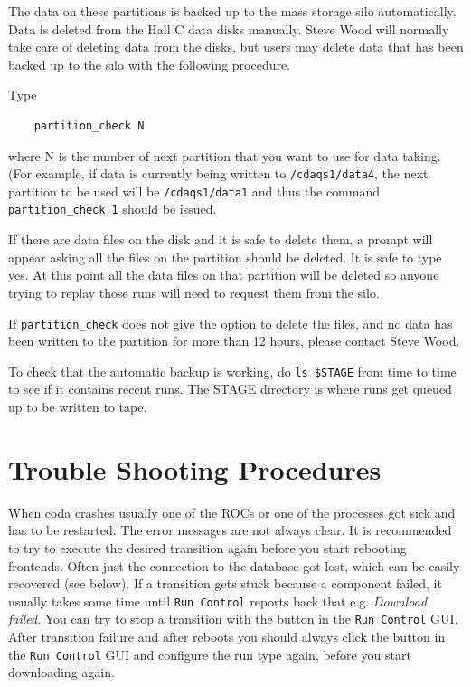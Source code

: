 The data on these partitions is backed up to the mass storage silo
automatically.  Data is deleted from the Hall C data disks manually.
Steve Wood will normally take care of deleting data from the disks, but users
may delete data that has been backed up to the silo with the following
procedure.

Type

\begin{verbatim}
	partition_check N
\end{verbatim}

where N is the number of next partition that you want to use for data taking.
(For example, if data is currently being written to \verb|/cdaqs1/data4|, the 
next
partition to be used will be \verb|/cdaqs1/data1| and thus the command
\verb|partition_check 1| should be issued.

If there are data files on the disk and it is safe to delete them, a prompt 
will appear asking all the files on the partition should be deleted.  
It is safe to
type yes.  At this point all the data files on that partition will be deleted
so anyone trying to replay those runs will need to request them from the silo.

If \verb|partition_check| does not give the option to delete the files, and no
data has been written to the partition for more than 12 hours, please contact
Steve Wood.

To check that the automatic backup is working, do \verb|ls $STAGE| from %
time to time to see if it contains recent runs.  The STAGE directory is where
runs get queued up to be written to tape.

\section{Trouble Shooting Procedures}
\label{trouble}
When coda crashes usually one of the ROCs or one of the processes got sick and
has to be restarted. The error messages are not always clear. It is 
recommended to try to execute the desired transition again before you start 
rebooting frontends. Often just the connection to the database got lost, which 
can be easily recovered (see below).
If a transition gets stuck because a component failed, it usually takes some 
time until \verb|Run Control| reports back that e.g. {\em Download failed}.
You can try to stop a transition with the  button in the 
\verb|Run Control| GUI. After transition failure and after reboots you 
should always click the  button in the \verb|Run Control| GUI and 
configure the run type again, before you start downloading again.   

